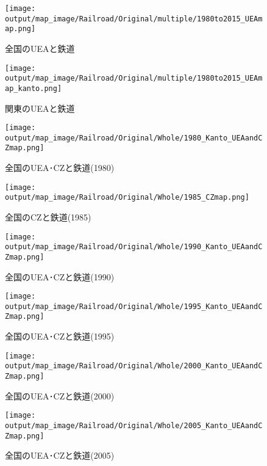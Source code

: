 \documentclass{ltjsarticle}
\begin{document}
\begin{figure}[pbth]
  \centering
  \texttt{[image: output/map\_image/Railroad/Original/multiple/1980to2015\_UEAmap.png]}
  \caption{\label{allUEAandRail}全国のUEAと鉄道}
\end{figure}


\begin{figure}[pbth]
  \centering
  \texttt{[image: output/map\_image/Railroad/Original/multiple/1980to2015\_UEAmap\_kanto.png]}
  \caption{\label{KanUEAandRail}関東のUEAと鉄道}
\end{figure}


\begin{figure}[pbth]
  \centering
  \texttt{[image: output/map\_image/Railroad/Original/Whole/1980\_Kanto\_UEAandCZmap.png]}
  \caption{\label{1980:allCZandUEA}全国のUEA･CZと鉄道(1980)}
\end{figure}


\begin{figure}[pbth]
  \centering
  \texttt{[image: output/map\_image/Railroad/Original/Whole/1985\_CZmap.png]}
  \caption{\label{1985:allCZandUEA}全国のCZと鉄道(1985)}
\end{figure}


\begin{figure}[pbth]
  \centering
  \texttt{[image: output/map\_image/Railroad/Original/Whole/1990\_Kanto\_UEAandCZmap.png]}
  \caption{\label{1990:allCZandUEA}全国のUEA･CZと鉄道(1990)}
\end{figure}


\begin{figure}[pbth]
  \centering
  \texttt{[image: output/map\_image/Railroad/Original/Whole/1995\_Kanto\_UEAandCZmap.png]}
  \caption{\label{1995:allCZandUEA}全国のUEA･CZと鉄道(1995)}
\end{figure}


\begin{figure}[pbth]
  \centering
  \texttt{[image: output/map\_image/Railroad/Original/Whole/2000\_Kanto\_UEAandCZmap.png]}
  \caption{\label{2000:allCZandUEA}全国のUEA･CZと鉄道(2000)}
\end{figure}


\begin{figure}[pbth]
  \centering
  \texttt{[image: output/map\_image/Railroad/Original/Whole/2005\_Kanto\_UEAandCZmap.png]}
  \caption{\label{2005:allCZandUEA}全国のUEA･CZと鉄道(2005)}
\end{figure}
\end{document}
